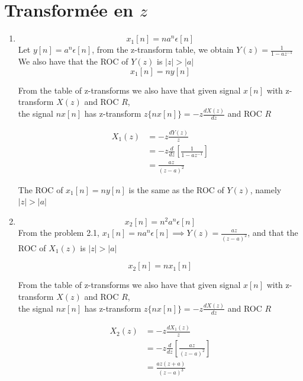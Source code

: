 \documentclass{article}
\begin{document}
\section{Transformée en $z$}
\begin{enumerate}
\item
$$
        x_1[n]= na^n\epsilon[n]
$$
        Let $y[n]= a^n\epsilon[n]$, from the z-transform table, we obtain $Y(z)= \frac{1}{1- az^{-1}}$\\
        We also have that the ROC of $Y(z)$ is $|z| > |a|$
        $$
        x_1[n]= ny[n]
        $$

        From the table of z-transforms we also have that given signal $x[n]$ with z-transform $X(z)$ and ROC $R$,\\
        the signal $nx[n]$ has z-transform $z\{nx[n]\}= -z\frac{dX(z)}{dz}$ and ROC $R$

        \begin{align}
         X_1(z) &= -z\frac{dY(z)}{z} \nonumber\\
                &= -z\frac{d}{dz}\left[ \frac{1}{1- az^{-1}}\right] \nonumber\\
                &= \frac{az}{(z-a)^2} \nonumber
        \end{align}

        The ROC of $x_1[n]= ny[n]$ is the same as the ROC of $Y(z)$, namely $|z| > |a|$

\item
$$
        x_2[n]= n^2a^n\epsilon[n]
$$
        From the problem 2.1, $x_1[n]= na^n\epsilon[n] \implies Y(z)= \frac{az}{(z-a)^2}$,
        and that the ROC of $X_1(z)$ is $|z| > |a|$

        $$
        x_2[n]= nx_1[n]
        $$

        From the table of z-transforms we also have that given signal $x[n]$ with z-transform $X(z)$ and ROC $R$,\\
        the signal $nx[n]$ has z-transform $z\{nx[n]\}= -z\frac{dX(z)}{dz}$ and ROC $R$

        \begin{align}
         X_2(z) &= -z\frac{dX_1(z)}{z} \nonumber\\
                &= -z\frac{d}{dz}\left[ \frac{az}{(z-a)^2}\right] \nonumber\\
                &= \frac{az(z +a)}{(z -a)^3} \nonumber
        \end{align}


\end{enumerate}
\end{document}

